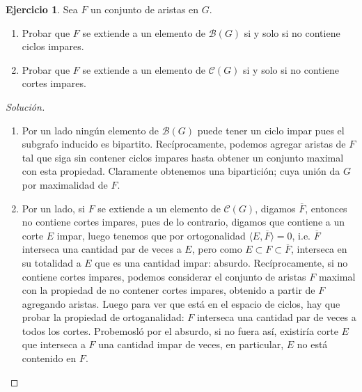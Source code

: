 \documentclass[12pt]{report}
\theoremstyle{plain}
\theoremstyle{definition}
\newtheorem{exercise}[theorem]{Ejercicio}
\newenvironment{solution}{\begin{proof}[Solución]}{\end{proof}}
\renewcommand{\bar}[1]{\overline{#1}}
\begin{document}
\begin{exercise}
Sea $F$ un conjunto de aristas en $G$.
\begin{enumerate}
\item Probar que $F$ se extiende a un elemento de $\mathcal B (G)$ si y solo si no contiene ciclos impares.
\item Probar que $F$ se extiende a un elemento de $\mathcal C (G)$ si y solo si no contiene cortes impares.
\end{enumerate}
\end{exercise}
\begin{solution}
\begin{enumerate}
\item Por un lado ningún elemento de $\mathcal B (G)$ puede tener un ciclo impar pues el subgrafo inducido es bipartito.
Recíprocamente, podemos agregar aristas de $F$ tal que siga sin contener ciclos impares hasta obtener un conjunto
maximal con esta propiedad. Claramente obtenemos una bipartición; cuya unión da $G$ por maximalidad de $F$.
\item Por un lado, si $F$ se extiende a un elemento de $\mathcal C (G)$, digamos $\bar F$, entonces no contiene
cortes
impares,
pues de lo contrario, digamos que contiene a un corte $E$ impar, luego tenemos que por ortogonalidad $\langle E, \bar F \rangle = 0$, i.e. $\bar F$  interseca una cantidad par de veces a $E$, pero como $E \subset F \subset \bar F$, interseca en su totalidad a $E$ que es una cantidad impar: absurdo. Recíprocamente, si no contiene cortes impares, podemos considerar el conjunto de aristas $F$ maximal con la propiedad de no contener cortes impares, obtenido a partir de $F$ agregando aristas. Luego para ver que está en el espacio de ciclos, hay que probar la propiedad de ortoganalidad: $F$ interseca una cantidad par de veces a todos los cortes. Probemosló por el absurdo, si no fuera así, existiría corte $E$ que interseca a $F$ una cantidad impar de veces, en particular, $E$ no está contenido en $F$.
\end{enumerate}
\end{solution}
\end{document}
